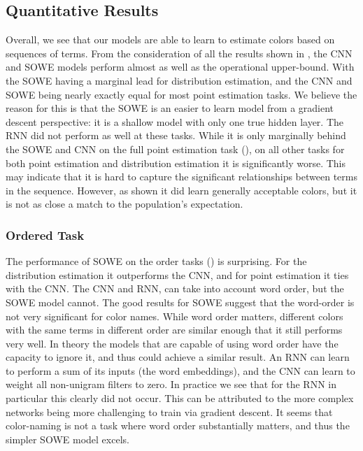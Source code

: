 \documentclass[11pt,a4paper]{article}
\begin{document}
\subsection{Quantitative Results}\label{sec:quantitative-results}

Overall, we see that our models are able to learn to estimate colors based on sequences of terms.
From the consideration of all the results shown in , 
the CNN and SOWE models perform almost as well as the operational upper-bound.
With the SOWE having a marginal lead for distribution estimation,
and the CNN and SOWE being nearly exactly equal for most point estimation tasks.
We believe the reason for this is that the SOWE is an easier to learn model from a gradient descent perspective:
it is a shallow model with only one true hidden layer.
The RNN did not perform as well at these tasks.
While it is only marginally behind the SOWE and CNN on the full point estimation task (), on all other tasks for both point estimation and distribution estimation it is significantly worse.
This may indicate that it is hard to capture the significant relationships between terms in the sequence.
However, as shown  it did learn generally acceptable colors, but it is not as close a match to the population's expectation.

\subsubsection{Ordered Task}
The performance of SOWE on the order tasks () is surprising.
For the distribution estimation it outperforms the CNN, and for point estimation it ties with the CNN.
The CNN and RNN, can take into account word order, but the SOWE model cannot.
The good results for SOWE suggest that the word-order is not very significant for color names.
While word order matters, different colors with the same terms in different order are similar enough that it still performs very well.
In theory the models that are capable of using word order have the capacity to ignore it, and thus could achieve a similar result.
An RNN can learn to perform a sum of its inputs (the word embeddings),
and the CNN can learn to weight all non-unigram filters to zero.
In practice we see that for the RNN in particular this clearly did not occur.
This can be attributed to the more complex networks being more challenging to train via gradient descent.
It seems that color-naming is not a task where word order substantially matters,
and thus the simpler SOWE model excels.
\end{document}
